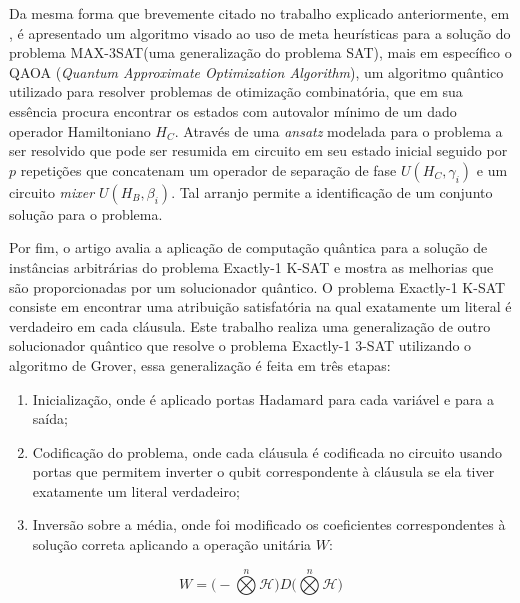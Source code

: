 \documentclass[12pt]{article}
\begin{document}

Da mesma forma que brevemente citado no trabalho explicado anteriormente, em \cite{mandl:24}, é apresentado um algoritmo visado ao uso de meta heurísticas para a solução do problema MAX-3SAT(uma generalização do problema SAT), mais em específico o QAOA (\textit{Quantum Approximate Optimization Algorithm}), um algoritmo quântico utilizado para resolver problemas de otimização combinatória, que em sua essência procura encontrar os estados com autovalor mínimo de um dado operador Hamiltoniano $H_C$. Através de uma \textit{ansatz} modelada para o problema a ser resolvido que pode ser resumida em circuito em seu estado inicial seguido por $p$ repetições que concatenam um operador de separação de fase $U(H_C,\gamma_i)$ e um circuito \textit{mixer} $U(H_B, \beta_i)$. Tal arranjo permite a identificação de um conjunto solução para o problema.


Por fim, o artigo \cite{piro:20} avalia a aplicação de computação quântica para a solução de instâncias arbitrárias do problema Exactly-1 K-SAT e mostra as melhorias que são proporcionadas por um solucionador quântico. O problema Exactly-1 K-SAT consiste em encontrar uma atribuição satisfatória na qual exatamente um literal é verdadeiro em cada cláusula. Este trabalho realiza uma generalização de outro solucionador quântico que resolve o problema Exactly-1 3-SAT utilizando o algoritmo de Grover, essa generalização é feita em três etapas:
\begin{enumerate}
    \item Inicialização, onde é aplicado portas Hadamard para cada variável e para a saída;
    \item Codificação do problema, onde cada cláusula é codificada no circuito usando portas que permitem inverter o qubit correspondente à cláusula se ela tiver exatamente um literal verdadeiro;
    \item Inversão sobre a média, onde foi modificado os coeficientes correspondentes à solução correta aplicando a operação unitária \(W\):
\end{enumerate} 
\[
W = \big( - \overset{n}{\bigotimes} \mathcal{H} \big) D \big( \overset{n}{\bigotimes} \mathcal{H} \big)
\]





\end{document}
